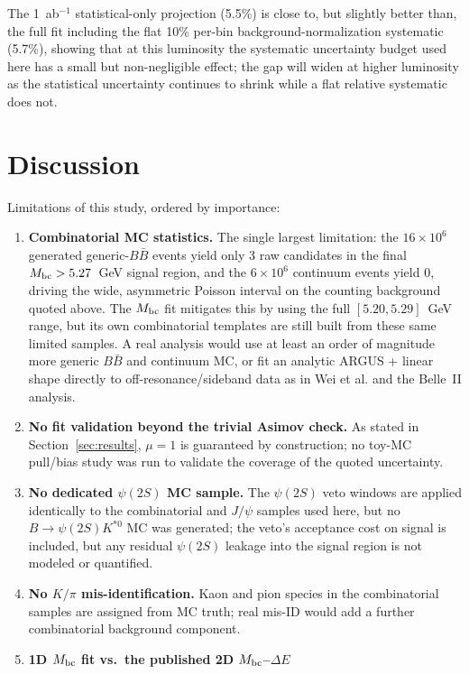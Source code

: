 \documentclass[11pt]{article}
\begin{document}
The 1~ab$^{-1}$ statistical-only projection (5.5\%) is close to, but
slightly better than, the full fit including the flat 10\% per-bin
background-normalization systematic (5.7\%), showing that at this
luminosity the systematic uncertainty budget used here has a small but
non-negligible effect; the gap will widen at higher luminosity as the
statistical uncertainty continues to shrink while a flat relative
systematic does not.

\section{Discussion}
\label{sec:discussion}

Limitations of this study, ordered by importance:

\begin{enumerate}
\item \textbf{Combinatorial MC statistics.} The single largest
limitation: the $16\times10^6$ generated generic-$B\bar B$ events yield
only 3 raw candidates in the final $M_{\rm bc}>5.27$~GeV signal region,
and the $6\times10^6$ continuum events yield 0, driving the wide,
asymmetric Poisson interval on the counting background quoted above.
The $M_{\rm bc}$ fit mitigates this by using the full $[5.20,5.29]$~GeV
range, but its own combinatorial templates are still built from these
same limited samples. A real analysis would use at least an order of
magnitude more generic $B\bar B$ and continuum MC, or fit an analytic
ARGUS + linear shape directly to off-resonance/sideband data as in Wei
et al. and the Belle~II analysis.
\item \textbf{No fit validation beyond the trivial Asimov check.} As
stated in Section~\ref{sec:results}, $\mu=1$ is guaranteed by
construction; no toy-MC pull/bias study was run to validate the
coverage of the quoted uncertainty.
\item \textbf{No dedicated $\psi(2S)$ MC sample.} The $\psi(2S)$ veto
windows are applied identically to the combinatorial and $J/\psi$
samples used here, but no $B\to\psi(2S)K^{*0}$ MC was generated; the
veto's acceptance cost on signal is included, but any residual
$\psi(2S)$ leakage into the signal region is not modeled or quantified.
\item \textbf{No $K/\pi$ mis-identification.} Kaon and pion species in
the combinatorial samples are assigned from MC truth; real mis-ID
would add a further combinatorial background component.
\item \textbf{1D $M_{\rm bc}$ fit vs.\ the published 2D $M_{\rm bc}$--$\Delta E$
}
\end{enumerate}
\end{document}
